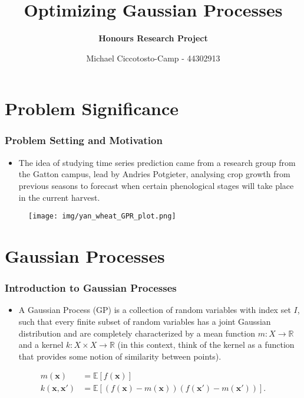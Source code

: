 \documentclass[9pt,hyperref={pdfpagelabels=false},xcolor=table]{beamer}
\title{Optimizing Gaussian Processes}
\author[Michael Ciccotosto-Camp]{{\bf Honours Research Project}}
\date{
Michael Ciccotosto-Camp - 44302913 \\
}
\begin{document}
\maketitle

\section{Problem Significance}

\begin{frame}
    \frametitle{Problem Setting and Motivation}
    \begin{itemize}
        \item The idea of studying time series prediction came from a research group from the Gatton campus, lead by Andries Potgieter, analysing crop growth from previous seasons to forecast when certain phenological stages will take place in the current harvest.
    \end{itemize}
    \begin{figure}
        \centering
        \texttt{[image: img/yan\_wheat\_GPR\_plot.png]}
    \end{figure}
\end{frame}

\section{Gaussian Processes}

\begin{frame}
    \frametitle{Introduction to Gaussian Processes}
    \begin{itemize}
        \item A Gaussian Process (GP) is a collection of random variables with index set $I$, such that every finite subset of random variables has a joint Gaussian distribution and are completely characterized by a mean function $m : X \to \mathbb{R}$ and a kernel $k : X \times X \to \mathbb{R}$ (in this context, think of the kernel as a function that provides some notion of similarity between points).
    \end{itemize}
    \begin{align*}
        m(\bm{x})           & = \mathbb{E} \left[ f(\bm{x}) \right]                                          \\
        k (\bm{x}, \bm{x'}) & = \mathbb{E} \left[ (f(\bm{x}) - m(\bm{x})) (f(\bm{x'}) - m(\bm{x'})) \right].
    \end{align*}
\end{frame}
\end{document}
